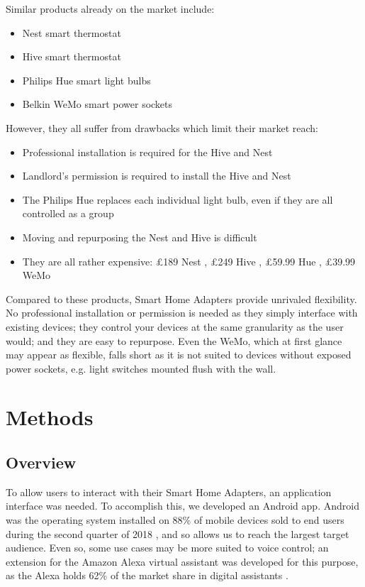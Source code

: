 \documentclass[onecolumn]{IEEEtran}
\begin{document}
Similar products already on the market include:
    \begin{itemize}
        \item {Nest smart thermostat}
        \item {Hive smart thermostat}
        \item {Philips Hue smart light bulbs}
        \item {Belkin WeMo smart power sockets}
    \end{itemize}
{However, they all suffer from drawbacks which limit their market reach:}
    \begin{itemize}
        \item {Professional installation is required for the Hive and Nest}
        \item {Landlord’s permission is required to install the Hive and Nest}
        \item {The Philips Hue replaces each individual light bulb, even if they are all controlled as a group}
        \item {Moving and repurposing the Nest and Hive is difficult}
        \item {They are all rather expensive: £189 Nest \cite{nestprice}, £249 Hive \cite{hiveprice}, £59.99 Hue \cite{hueprice}, £39.99 WeMo \cite{wemoprice}}
    \end{itemize}
    
    {Compared to these products, Smart Home Adapters provide unrivaled flexibility. No professional installation or permission is needed as they simply 
    interface with existing devices; they control your devices at the same 
    granularity as the user would; and they are easy to repurpose. Even the 
    WeMo, which at first glance may appear as flexible, falls short as it is
    not suited to devices without exposed power sockets, e.g. light switches 
    mounted flush with the wall.}

\section{Methods}

\subsection{Overview}

    {To allow users to interact with their Smart Home Adapters, an application 
    interface was needed. To accomplish this, we developed an Android app. Android 
    was the operating system installed on 88\% of mobile devices sold to end users 
    during the second quarter of 2018 \cite{androidmarket}, and so allows us to reach the largest target 
    audience. Even so, some use cases may be more suited to voice control; an 
    extension for the Amazon Alexa virtual assistant was developed for this purpose,
    as the Alexa holds 62\% of the market share in digital assistants \cite{alexamarket}}.
    
\end{document}

